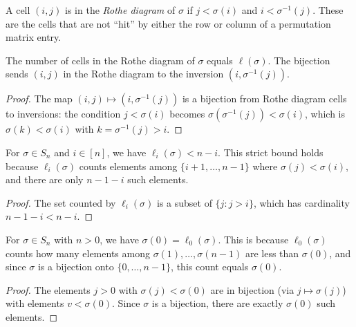 \begin{definition}
\label{def.perm.inRotheDiagram}
\leanhelper
\leanok
A cell $(i, j)$ is in the \emph{Rothe diagram} of $\sigma$ if
$j < \sigma(i)$ and $i < \sigma^{-1}(j)$.
These are the cells that are not ``hit'' by either the row or column
of a permutation matrix entry.
\end{definition}

\begin{lemma}
\label{lem.perm.rotheDiagram_card_eq_length}
\leanhelper
\leanok
The number of cells in the Rothe diagram of $\sigma$ equals $\ell(\sigma)$.
The bijection sends $(i, j)$ in the Rothe diagram to the inversion $(i, \sigma^{-1}(j))$.
\end{lemma}

\begin{proof}
\leanok
The map $(i,j) \mapsto (i, \sigma^{-1}(j))$ is a bijection from Rothe diagram cells
to inversions: the condition $j < \sigma(i)$ becomes $\sigma(\sigma^{-1}(j)) < \sigma(i)$,
which is $\sigma(k) < \sigma(i)$ with $k = \sigma^{-1}(j) > i$.
\end{proof}

\begin{lemma}
\label{lem.perm.lehmerEntry_lt2}
\leanhelper
\leanok
For $\sigma \in S_n$ and $i \in [n]$, we have $\ell_i(\sigma) < n - i$.
This strict bound holds because $\ell_i(\sigma)$ counts elements among
$\{i+1, \ldots, n-1\}$ where $\sigma(j) < \sigma(i)$,
and there are only $n - 1 - i$ such elements.
\end{lemma}

\begin{proof}
\leanok
The set counted by $\ell_i(\sigma)$ is a subset of $\{j : j > i\}$,
which has cardinality $n - 1 - i < n - i$.
\end{proof}

\begin{lemma}
\label{lem.perm.sigma_zero_eq_lehmerEntry}
\leanhelper
\leanok
For $\sigma \in S_n$ with $n > 0$, we have $\sigma(0) = \ell_0(\sigma)$.
This is because $\ell_0(\sigma)$ counts how many elements among
$\sigma(1), \ldots, \sigma(n-1)$ are less than $\sigma(0)$,
and since $\sigma$ is a bijection onto $\{0, \ldots, n-1\}$,
this count equals $\sigma(0)$.
\end{lemma}

\begin{proof}
The elements $j > 0$ with $\sigma(j) < \sigma(0)$ are in bijection
(via $j \mapsto \sigma(j)$) with elements $v < \sigma(0)$.
Since $\sigma$ is a bijection, there are exactly $\sigma(0)$ such elements.
\end{proof}

